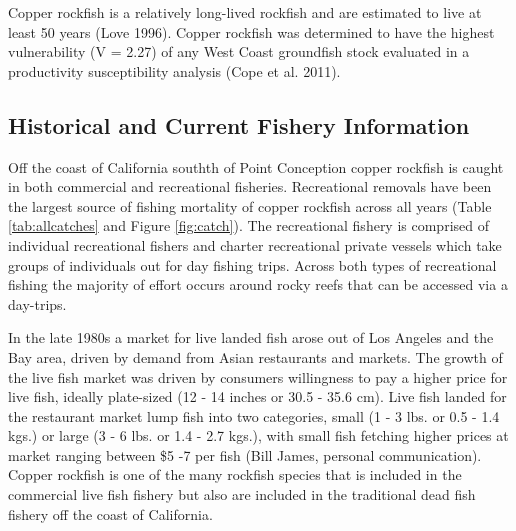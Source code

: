 \documentclass[11pt,
  english,
  a4paper,
]{article}
\begin{document}
\leavevmode\tagmcend\tagstructend\par


Copper rockfish is a relatively long-lived rockfish and are estimated to live at least 50 years {(Love 1996)\leavevmode\tagmcend\tagstructend}. Copper rockfish was determined to have the highest vulnerability (V = 2.27) of any West Coast groundfish stock evaluated in a productivity susceptibility analysis {(Cope et al. 2011)\leavevmode\tagmcend\tagstructend}.

\leavevmode\tagmcend\tagstructend\par


\hypertarget{historical-and-current-fishery-information}{%
\subsection{Historical and Current Fishery Information}\label{historical-and-current-fishery-information}}

\leavevmode\tagmcend\tagstructend


Off the coast of California southth of Point Conception copper rockfish is caught in both commercial and recreational fisheries. Recreational removals have been the largest source of fishing mortality of copper rockfish across all years (Table \ref{tab:allcatches} and Figure \ref{fig:catch}). The recreational fishery is comprised of individual recreational fishers and charter recreational private vessels which take groups of individuals out for day fishing trips. Across both types of recreational fishing the majority of effort occurs around rocky reefs that can be accessed via a day-trips.

\leavevmode\tagmcend\tagstructend\par


In the late 1980s a market for live landed fish arose out of Los Angeles and the Bay area, driven by demand from Asian restaurants and markets. The growth of the live fish market was driven by consumers willingness to pay a higher price for live fish, ideally plate-sized (12 - 14 inches or 30.5 - 35.6 cm). Live fish landed for the restaurant market lump fish into two categories, small (1 - 3 lbs. or 0.5 - 1.4 kgs.) or large (3 - 6 lbs. or 1.4 - 2.7 kgs.), with small fish fetching higher prices at market ranging between \$5 -7 per fish (Bill James, personal communication). Copper rockfish is one of the many rockfish species that is included in the commercial live fish fishery but also are included in the traditional dead fish fishery off the coast of California.
\end{document}
